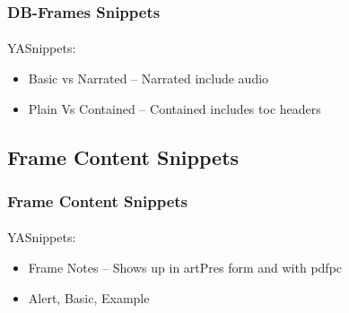 \begin{frame}[fragile,label=DB-FramesSnippets]
    \frametitle{DB-Frames Snippets}
    \framesubtitle{}

    YASnippets:

    \begin{itemize}
    \item Basic vs Narrated  -- Narrated include audio
    \item Plain Vs Contained  -- Contained includes toc headers
    \end{itemize}

\end{frame}


\begin{comment}
**  [[elisp:(org-cycle)][| ]] [[elisp:(org-show-subtree)][|=]] [[elisp:(show-children 10)][|V]] [[elisp:(bx:orgm:indirectBufOther)][|>]] [[elisp:(bx:orgm:indirectBufMain)][|I]] [[elisp:(blee:ppmm:org-mode-toggle)][|N]] [[elisp:(org-top-overview)][|O]] [[elisp:(progn (org-shifttab) (org-content))][|C]] [[elisp:(delete-other-windows)][|1]]  /Subsection/   Frame Content Snippets ::  [[elisp:(org-cycle)][| ]]
\end{comment}

\subsection{Frame Content Snippets}


\begin{comment}
*****  [[elisp:(org-cycle)][| ]]  [[elisp:(blee:ppmm:org-mode-toggle)][Nat]] [[elisp:(beginning-of-buffer)][Top]] [[elisp:(delete-other-windows)][(1)]] || /Frame/ *Label=FrameContentSnippets*  Frame Content Snippets ::  [[elisp:(org-cycle)][| ]]
\end{comment}

\begin{frame}[fragile,label=FrameContentSnippets]
    \frametitle{Frame Content Snippets}
    \framesubtitle{}

    YASnippets:

    \begin{itemize}
    \item Frame Notes  -- Shows up in artPres form and with pdfpc
    \item Alert, Basic, Example
    \end{itemize}

\end{frame}



